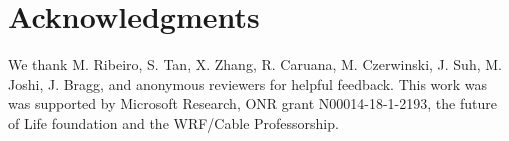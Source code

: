 \documentclass[letterpaper]{article} %
\newcommand{\?}{\mbox{?}}
\begin{document}

\section{Acknowledgments}
We thank  M.  Ribeiro,  S.  Tan,  X.
Zhang,  R.  Caruana,  M.  Czerwinski,  J.  Suh,  M.  Joshi,  J.
Bragg, and anonymous reviewers for helpful feedback. This work was
was supported by Microsoft Research, ONR grant N00014-18-1-2193, the future of Life foundation and the WRF/Cable Professorship.


\end{document}
